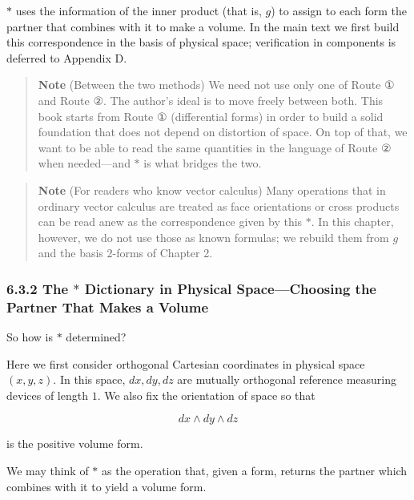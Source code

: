 \(\ast\) uses the information of the inner product (that is, \(g\)) to
assign to each form the partner that combines with it to make a volume.
In the main text we first build this correspondence in the basis of
physical space; verification in components is deferred to Appendix D.

\begin{quote}
\textbf{Note} (Between the two methods) We need not use only one of
Route ① and Route ②. The author's ideal is to move freely between both.
This book starts from Route ① (differential forms) in order to build a
solid foundation that does not depend on distortion of space. On top of
that, we want to be able to read the same quantities in the language of
Route ② when needed---and \(\ast\) is what bridges the two.
\end{quote}

\begin{quote}
\textbf{Note} (For readers who know vector calculus) Many operations
that in ordinary vector calculus are treated as face orientations or
cross products can be read anew as the correspondence given by this
\(\ast\). In this chapter, however, we do not use those as known
formulas; we rebuild them from \(g\) and the basis \(2\)-forms of
Chapter 2.
\end{quote}

\hypertarget{the-ast-dictionary-in-physical-spacechoosing-the-partner-that-makes-a-volume}{%
\subsubsection{\texorpdfstring{6.3.2 The \(\ast\) Dictionary in Physical
Space---Choosing the Partner That Makes a
Volume}{6.3.2 The \textbackslash ast Dictionary in Physical Space---Choosing the Partner That Makes a Volume}}\label{the-ast-dictionary-in-physical-spacechoosing-the-partner-that-makes-a-volume}}

So how is \(\ast\) determined?

Here we first consider orthogonal Cartesian coordinates in physical
space \((x,y,z)\). In this space, \(dx, dy, dz\) are mutually orthogonal
reference measuring devices of length \(1\). We also fix the orientation
of space so that

\[
dx \wedge dy \wedge dz
\]

is the positive volume form.

We may think of \(\ast\) as the operation that, given a form, returns
the partner which combines with it to yield a volume form.


